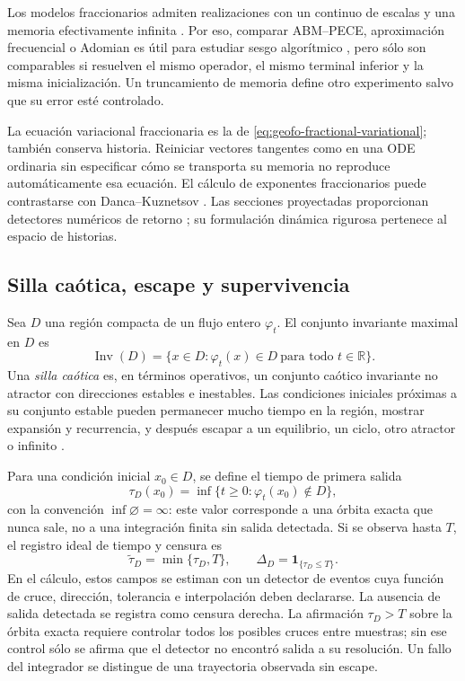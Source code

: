 Los modelos fraccionarios admiten realizaciones con un continuo de escalas y
una memoria efectivamente infinita \cite{Sabatier2021InfiniteMemory}. Por eso,
comparar ABM--PECE, aproximación frecuencial o Adomian es útil para estudiar
sesgo algorítmico \cite{SunHeWang2022FractionalChaos}, pero sólo son
comparables si resuelven el mismo operador, el mismo terminal inferior y la
misma inicialización. Un truncamiento de memoria define otro experimento salvo
que su error esté controlado.

La ecuación variacional fraccionaria es la de
\cref{eq:geofo-fractional-variational}; también conserva historia. Reiniciar
vectores tangentes como en una ODE ordinaria sin especificar cómo se transporta
su memoria no reproduce automáticamente esa ecuación. El cálculo de exponentes fraccionarios puede contrastarse con
Danca--Kuznetsov \cite{DancaKuznetsov2018Lyapunov}. Las secciones proyectadas
proporcionan detectores numéricos de retorno
\cite{ClementeLopezEtAl2022Poincare}; su formulación dinámica rigurosa
pertenece al espacio de historias.

\subsection{Silla caótica, escape y supervivencia}

Sea \(D\) una región compacta de un flujo entero \(\varphi_t\). El conjunto
invariante maximal en \(D\) es
\begin{equation}
 \operatorname{Inv}(D)
 =\{x\in D:\varphi_t(x)\in D\ \text{para todo }t\in\mathbb R\}.
 \label{eq:reliability-maximal-invariant}
\end{equation}
Una \emph{silla caótica} es, en términos operativos, un conjunto caótico
invariante no atractor con direcciones estables e inestables. Las condiciones
iniciales próximas a su conjunto estable pueden permanecer mucho tiempo en
la región, mostrar expansión y recurrencia, y después escapar a un equilibrio,
un ciclo, otro atractor o infinito \cite{Ott2002Chaos,TelGruiz2006Chaotic}.

Para una condición inicial \(x_0\in D\), se define el tiempo de primera salida
\begin{equation}
 \tau_D(x_0)=
 \inf\{t\geq0:\varphi_t(x_0)\notin D\},
 \label{eq:reliability-exit-time}
\end{equation}
con la convención \(\inf\varnothing=\infty\): este valor corresponde a una
órbita exacta que nunca sale, no a una integración finita sin salida detectada.
Si se observa hasta \(T\), el registro ideal de tiempo y censura es
\begin{equation}
 \widetilde\tau_D=\min\{\tau_D,T\},\qquad
 \Delta_D=\mathbf 1_{\{\tau_D\leq T\}}.
 \label{eq:reliability-censored-exit}
\end{equation}
En el cálculo, estos campos se estiman con un detector de eventos cuya
función de cruce, dirección, tolerancia e interpolación deben declararse. La
ausencia de salida detectada se registra como censura derecha. La afirmación
\(\tau_D>T\) sobre la órbita exacta requiere controlar todos los posibles
cruces entre muestras; sin ese control sólo se afirma que el detector no
encontró salida a su resolución. Un fallo del integrador se distingue de una
trayectoria observada sin escape.

